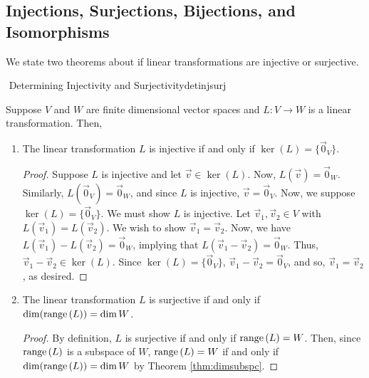     \pagebreak

    \subsection{Injections, Surjections, Bijections, and Isomorphisms}

        We state two theorems about if linear transformations are injective or surjective.
        \begin{theorem}{\Stop\,\,Determining Injectivity and Surjectivity}{detinjsurj}

            Suppose \(V\) and \(W\) are finite dimensional vector spaces and \(L:V\to W\) is a linear transformation. Then,
            \begin{enumerate}
                \item The linear transformation \(L\) is injective if and only if \(\ker(L)=\{\vec{0}_V\}\).
                \begin{proof}
                    Suppose \(L\) is injective and let \(\vec{v}\in\ker(L)\). Now, \(L(\vec{v})=\vec{0}_W\). Similarly, \(L(\vec{0}_V)=\vec{0}_W\), and since \(L\) is injective, \(\vec{v}=\vec{0}_V\). Now, we suppose \(\ker(L)=\{\vec{0}_V\}\). We must show \(L\) is injective. Let \(\vec{v}_1,\vec{v}_2\in V\) with \(L(\vec{v}_1)=L(\vec{v}_2)\). We wish to show \(\vec{v}_1=\vec{v}_2\). Now, we have \(L(\vec{v}_1)-L(\vec{v}_2)=\vec{0}_W\), implying that \(L(\vec{v}_1-\vec{v}_2)=\vec{0}_W\). Thus, \(\vec{v}_1-\vec{v}_2\in\ker(L)\). Since \(\ker(L)=\{\vec{0}_V\}\), \(\vec{v}_1-\vec{v}_2=\vec{0}_V\), and so, \(\vec{v}_1=\vec{v}_2\), as desired.
                \end{proof}
                \item The linear transformation \(L\) is surjective if and only if \(\dim(\text{range\,}(L))=\dim W\).
                \begin{proof}
                    By definition, \(L\) is surjective if and only if \(\text{range\,}(L)=W\). Then, since \(\text{range\,}(L)\) is a subspace of \(W\), \(\text{range\,}(L)=W\) if and only if \(\dim(\text{range\,}(L))=\dim W\) by Theorem \ref{thm:dimsubspc}.
                \end{proof}
            \end{enumerate}
            
        \end{theorem}
